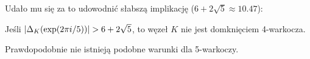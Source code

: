 Udało mu się za to udowodnić słabszą implikację ($6 + 2 \sqrt{5} \approx 10.47$):

\begin{proposition}
    Jeśli $|\Delta_K(\exp(2\pi i/5))| > 6 + 2 \sqrt{5}$, to węzeł $K$ nie jest domknięciem 4-warkocza.
\end{proposition}

Prawdopodobnie nie istnieją podobne warunki dla 5-warkoczy.

%


